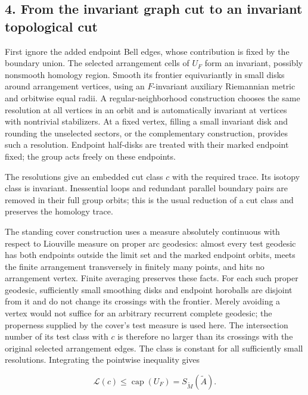 \documentclass[11pt]{article}
\begin{document}
\subsection{4. From the invariant graph cut to an invariant topological
cut}\label{from-the-invariant-graph-cut-to-an-invariant-topological-cut}

First ignore the added endpoint Bell edges, whose contribution is fixed
by the boundary union. The selected arrangement cells of \(U_F\) form an
invariant, possibly nonsmooth homology region. Smooth its frontier
equivariantly in small disks around arrangement vertices, using an
\(F\)-invariant auxiliary Riemannian metric and orbitwise equal radii. A
regular-neighborhood construction chooses the same resolution at all
vertices in an orbit and is automatically invariant at vertices with
nontrivial stabilizers. At a fixed vertex, filling a small invariant
disk and rounding the unselected sectors, or the complementary
construction, provides such a resolution. Endpoint half-disks are
treated with their marked endpoint fixed; the group acts freely on these
endpoints.

The resolutions give an embedded cut class \(c\) with the required
trace. Its isotopy class is invariant. Inessential loops and redundant
parallel boundary pairs are removed in their full group orbits; this is
the usual reduction of a cut class and preserves the homology trace.

The standing cover construction uses a measure absolutely continuous
with respect to Liouville measure on proper arc geodesics: almost every
test geodesic has both endpoints outside the limit set and the marked
endpoint orbits, meets the finite arrangement transversely in finitely
many points, and hits no arrangement vertex. Finite averaging preserves
these facts. For each such proper geodesic, sufficiently small smoothing
disks and endpoint horoballs are disjoint from it and do not change its
crossings with the frontier. Merely avoiding a vertex would not suffice
for an arbitrary recurrent complete geodesic; the properness supplied by
the cover's test measure is used here. The intersection number of its
test class with \(c\) is therefore no larger than its crossings with the
original selected arrangement edges. The class is constant for all
sufficiently small resolutions. Integrating the pointwise inequality
gives

\[
 \mathcal L(c)\le \operatorname{cap}(U_F)=S_{\widetilde M}(\widetilde A).
 \tag{4}
\]
\end{document}

